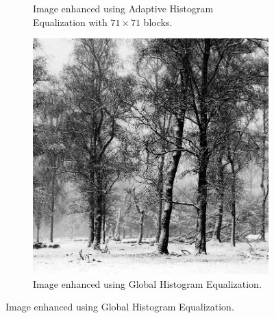 \documentclass[a4paper, landscape]{article}
\begin{document}
\begin{figure}
\begin{subfigure}{0.32\linewidth}
        \caption{Image enhanced using Adaptive Histogram Equalization with $71\times 71$ blocks.}
        \label{lc2_71_ahe}
    \end{subfigure}
    \begin{subfigure}{0.32\linewidth}
        \centering
        \includegraphics[height=0.4\textheight, keepaspectratio]{global_histogram_LC2.jpg}
		\caption{Image enhanced using Global Histogram Equalization.}
        \label{lc2_ghe}
    \end{subfigure}
\end{figure}
\end{document}
